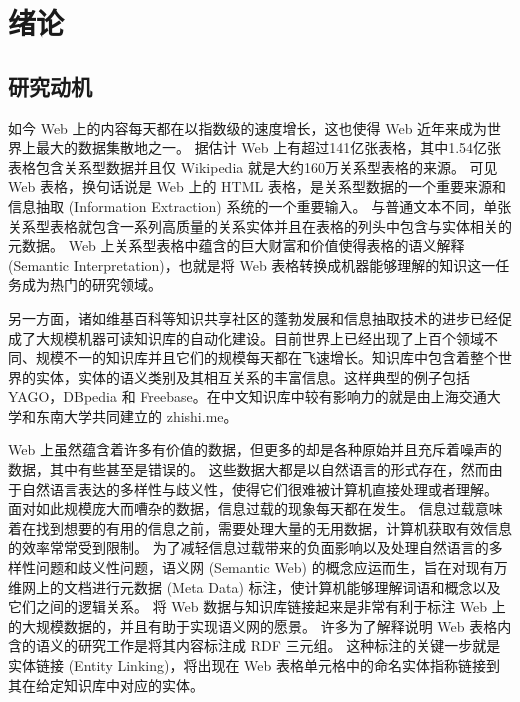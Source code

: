 \chapter{绪论}

\section{研究动机}
如今 Web 上的内容每天都在以指数级的速度增长\cite{limaye2010annotating}，这也使得 Web 近年来成为世界上最大的数据集散地之一。
据估计 Web 上有超过141亿张表格，其中1.54亿张表格包含关系型数据并且仅 Wikipedia 就是大约160万关系型表格的来源。
可见Web 表格，换句话说是 Web 上的 HTML 表格，是关系型数据的一个重要来源和信息抽取 (Information Extraction) 系统的一个重要输入。
与普通文本不同，单张关系型表格就包含一系列高质量的关系实体并且在表格的列头中包含与实体相关的元数据。
Web 上关系型表格中蕴含的巨大财富和价值使得表格的语义解释 (Semantic Interpretation)，也就是将 Web 表格转换成机器能够理解的知识这一任务成为热门的研究领域。\par

另一方面，诸如维基百科等知识共享社区的蓬勃发展和信息抽取技术的进步已经促成了大规模机器可读知识库的自动化建设。目前世界上已经出现了上百个领域不同、规模不一的知识库并且它们的规模每天都在飞速增长。知识库中包含着整个世界的实体，实体的语义类别及其相互关系的丰富信息。这样典型的例子包括 YAGO\cite{suchanek2007yago}，DBpedia\cite{auer2007dbpedia} 和 Freebase\cite{bollacker2008freebase}。在中文知识库中较有影响力的就是由上海交通大学和东南大学共同建立的 zhishi.me\cite{niu2011zhishi}。\par

Web 上虽然蕴含着许多有价值的数据，但更多的却是各种原始并且充斥着噪声的数据，其中有些甚至是错误的。
这些数据大都是以自然语言的形式存在，然而由于自然语言表达的多样性与歧义性，使得它们很难被计算机直接处理或者理解。
面对如此规模庞大而嘈杂的数据，信息过载的现象每天都在发生。
信息过载意味着在找到想要的有用的信息之前，需要处理大量的无用数据，计算机获取有效信息的效率常常受到限制。
为了减轻信息过载带来的负面影响以及处理自然语言的多样性问题和歧义性问题，语义网 (Semantic Web) 的概念应运而生，旨在对现有万维网上的文档进行元数据 (Meta Data) 标注，使计算机能够理解词语和概念以及它们之间的逻辑关系。
将 Web 数据与知识库链接起来是非常有利于标注 Web 上的大规模数据的，并且有助于实现语义网的愿景\cite{berners2001}。
许多为了解释说明 Web 表格内含的语义的研究工作\cite{hignette2009fuzzy}\cite{limaye2010annotating}\cite{mulwad2013semantic}\cite{munoz2014using}\cite{syed2010exploiting}\cite{venetis2011recovering}是将其内容标注成 RDF 三元组。
这种标注的关键一步就是实体链接 (Entity Linking)，将出现在 Web 表格单元格中的命名实体指称链接到其在给定知识库中对应的实体。\par

